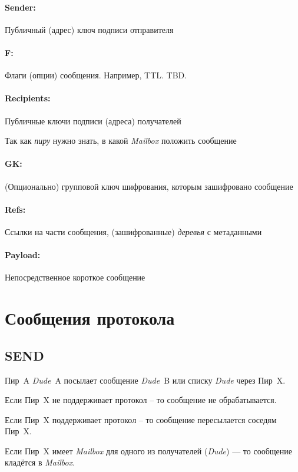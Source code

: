 \documentclass[11pt,a4paper]{article}
\newcommand{\term}[2]{\textit{#2}}
\newcommand{\Dude}{\term{dude}{Dude}}
\newcommand{\Mailbox}{\term{mailbox}{Mailbox}}
\begin{document}
\paragraph{Sender:}  Публичный (адрес) ключ подписи отправителя

\paragraph{F:} Флаги (опции) сообщения. Например, TTL. TBD.

\paragraph{Recipients:} Публичные ключи подписи (адреса) получателей

Так как \term{peer}{пиру} нужно знать, в какой \Mailbox{} положить сообщение


\paragraph{GK:} (Опционально) групповой ключ шифрования, которым зашифровано
сообщение

\paragraph{Refs:} Ссылки на части сообщения, (зашифрованные)
\term{merkle}{деревья} с метаданными

\paragraph{Payload:} Непосредственное короткое сообщение


\section{Сообщения протокола}

\subsection{SEND}

Пир~A \Dude~A посылает сообщение \Dude~B или списку \Dude{} через Пир~X.

Если Пир~X не поддерживает протокол -- то сообщение не обрабатывается.

Если Пир~X поддерживает протокол -- то сообщение пересылается соседям Пир~X.

Если Пир~X имеет \Mailbox{} для одного из получателей (\Dude{}) --- то сообщение
кладётся в \Mailbox{}.
\end{document}
